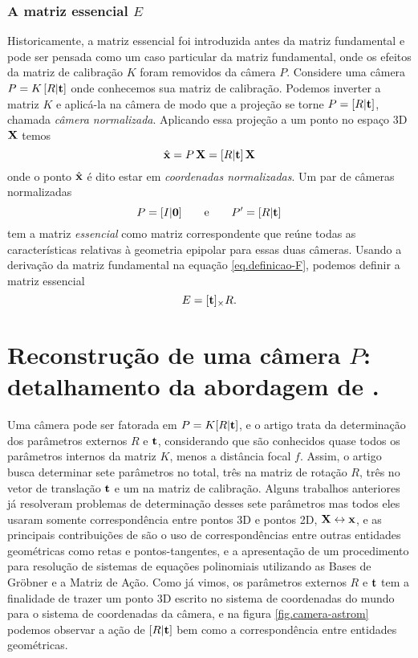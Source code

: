 \subsubsection*{A matriz essencial $E$}
Historicamente, a matriz essencial foi introduzida antes da matriz fundamental e pode ser pensada como um caso particular da matriz fundamental, onde os efeitos da matriz de calibração $K$ foram removidos da câmera $P$. Considere uma câmera $P=K\,[R|{\bf t}]$ onde conhecemos sua matriz de calibração. Podemos inverter a matriz $K$ e aplicá-la na câmera de modo que a projeção se torne $P=[R|{\bf t}]$, chamada {\it câmera normalizada}. Aplicando essa projeção a um ponto no espaço 3D $\mathbf{X}$ temos 
\begin{equation*}
\hat{\mathbf{x}}=P\,\mathbf{X}=[R|{\bf t}]\,\mathbf{X}
\end{equation*}
onde o ponto $\hat{\mathbf{x}}$ é dito estar em {\it coordenadas  normalizadas}. Um par de câmeras normalizadas 
\begin{equation*}
P=[I|{\bf 0}]\qquad\text{e}\qquad P'=[R|{\bf t}]
\end{equation*}
tem a matriz {\it essencial} como matriz correspondente que reúne todas as características relativas à geometria epipolar para essas duas câmeras. Usando a derivação da matriz fundamental na equação \ref{eq.definicao-F}, podemos definir a matriz essencial
\begin{equation*}
E=[{\bf t}]_\times R.
\end{equation*}

\section{Reconstrução de uma câmera $P$: detalhamento da abordagem de \citep{bib:kuang}.}\label{sec.astrom}
Uma câmera pode ser fatorada em $P=K[R|{\bf t}]$, e o artigo \citep{bib:kuang} trata da determinação dos parâmetros externos $R$ e ${\bf t}$, considerando que são conhecidos quase todos os parâmetros internos da matriz $K$, menos a distância focal $f$. Assim, o artigo busca determinar sete parâmetros no total, três na matriz de rotação $R$, três no vetor de translação ${\bf t}$ e um na matriz de calibração. Alguns trabalhos anteriores já resolveram problemas de determinação desses sete parâmetros mas todos eles usaram somente correspondência entre pontos 3D e pontos 2D, $\mathbf{X}\leftrightarrow\mathbf{x}$, e as principais contribuições de \citep{bib:kuang} são o uso de correspondências entre outras entidades geométricas como retas e pontos-tangentes, e a apresentação de um procedimento para resolução de sistemas de equações polinomiais utilizando as Bases de Gr\"obner e a Matriz de Ação. Como já vimos, os parâmetros externos $R$ e ${\bf t}$ tem a finalidade de trazer um ponto 3D escrito no sistema de coordenadas do mundo para o sistema de coordenadas da câmera, e na figura \ref{fig.camera-astrom} podemos observar a ação de $[R|{\bf t}]$ bem como a correspondência entre entidades geométricas.

